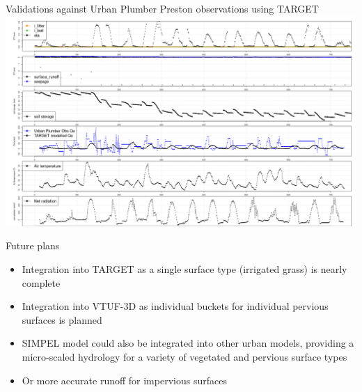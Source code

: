 \documentclass{beamer}
\begin{document}
\begin{frame}{Validations against Urban Plumber Preston observations using TARGET} 
\includegraphics[scale=0.20]{PrestonFeb2004_4mmIrr_ground.png}
\end{frame}


\begin{frame}{Future plans} 

\begin{itemize}

\item Integration into TARGET as a single surface type (irrigated grass) is nearly complete

\item Integration into VTUF-3D as individual buckets for individual pervious surfaces is planned

\item SIMPEL model could also be integrated into other urban models, providing a micro-scaled hydrology for a variety of vegetated and pervious surface types

\item Or more accurate runoff for impervious surfaces

\end{itemize}


\end{frame}



%
%
\end{document}
